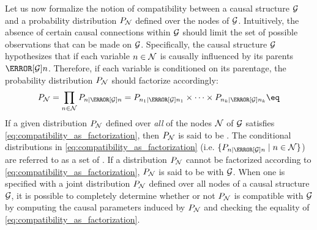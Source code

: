 \documentclass[aps, 10pt, english, twoside, pra, nofootinbib, tightenlines, longbibliography, superscriptaddress]{revtex4-1}
\begin{document}
    Let us now formalize the notion of compatibility between a causal structure $\mathcal{G}$ and a probability distribution $\prob[\nodes]$ defined over the nodes of $\mathcal{G}$. Intuitively, the absence of certain causal connections within $\mathcal{G}$ should limit the set of possible observations that can be made on $\mathcal{G}$. Specifically, the causal structure $\mathcal{G}$ hypothesizes that if each variable $n \in \mathcal{N}$ is causally influenced by its parents $\Pa[\graph]{n}$. Therefore, if each variable is conditioned on its parentage, the probability distribution $\prob[\nodes]$ should factorize accordingly:
    \[ \prob[\nodes] = \prod_{n \in \nodes} \prob[n \mid \Pa[\graph]{n}] = \prob[n_1 \mid \Pa[\graph]{n_1}] \times \cdots \times \prob[n_k \mid \Pa[\graph]{n_k}] \eq \label{eq:compatibility_as_factorization}\]
    If a given distribution $\prob[\nodes]$ defined over \textit{all} of the nodes $\mathcal{N}$ of $\mathcal{G}$ satisfies \cref{eq:compatibility_as_factorization}, then $\prob[\nodes]$ is said to be . The conditional distributions in \cref{eq:compatibility_as_factorization} (i.e. $\{\prob[n \mid \Pa[\graph]{n}] \mid n \in \nodes\}$) are referred to as a set of . If a distribution $\prob[\nodes]$ cannot be factorized according to \cref{eq:compatibility_as_factorization}, $\prob[\nodes]$ is said to be  with $\mathcal{G}$.
     When one is specified with a joint distribution $\prob[\nodes]$ defined over all nodes of a causal structure $\mathcal{G}$, it is possible to completely determine whether or not $\prob[\nodes]$ is compatible with $\mathcal{G}$ by computing the causal parameters induced by $\prob[\nodes]$ and checking the equality of \cref{eq:compatibility_as_factorization}.
\end{document}
